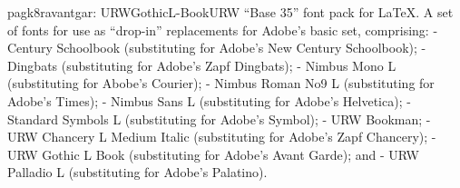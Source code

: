 \documentclass{ddltxtyp}
\begin{document}

\begin{package}{pagk8r}{avantgar: URWGothicL-Book}{URW ``Base 35'' font pack for {\LaTeX}.}
A set of fonts for use as ``drop-in'' replacements for Adobe's
basic set, comprising: - Century Schoolbook (substituting for
Adobe's New Century Schoolbook); - Dingbats (substituting for
Adobe's Zapf Dingbats); - Nimbus Mono L (substituting for
Abobe's Courier); - Nimbus Roman No9 L (substituting for
Adobe's Times); - Nimbus Sans L (substituting for Adobe's
Helvetica); - Standard Symbols L (substituting for Adobe's
Symbol); - URW Bookman; - URW Chancery L Medium Italic
(substituting for Adobe's Zapf Chancery); - URW Gothic L Book
(substituting for Adobe's Avant Garde); and - URW Palladio L
(substituting for Adobe's Palatino).
\end{package}

\end{document}

